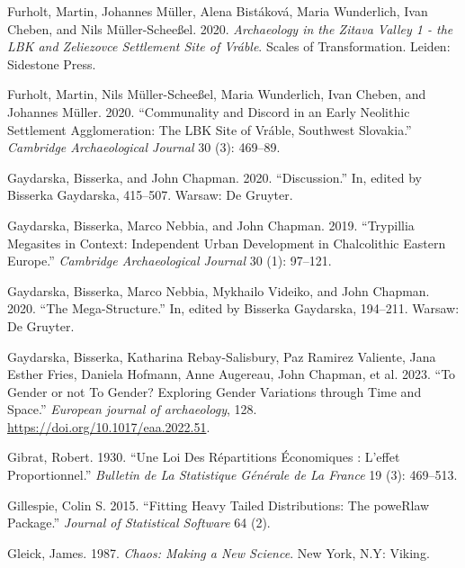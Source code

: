 \documentclass[
  12pt,
  a4paper, twoside]{book}
\newlength{\cslhangindent}
\newlength{\cslentryspacingunit} %
\newenvironment{CSLReferences}[2] %
 {%
  \setlength{\parindent}{0pt}
  \ifodd #1
  \let\oldpar\par
  \def\par{\hangindent=\cslhangindent\oldpar}
  \fi
  \setlength{\parskip}{#2\cslentryspacingunit}
 }%
 {}
\begin{document}
\begin{CSLReferences}{1}{0}
\leavevmode{}%
Furholt, Martin, Johannes Müller, Alena Bistáková, Maria Wunderlich, Ivan Cheben, and Nils Müller-Scheeßel. 2020. \emph{Archaeology in the Zitava Valley 1 - the LBK and Zeliezovce Settlement Site of Vráble}. Scales of Transformation. Leiden: Sidestone Press.

\leavevmode{}%
Furholt, Martin, Nils Müller-Scheeßel, Maria Wunderlich, Ivan Cheben, and Johannes Müller. 2020. {``Communality and Discord in an Early Neolithic Settlement Agglomeration: The LBK Site of Vráble, Southwest Slovakia.''} \emph{Cambridge Archaeological Journal} 30 (3): 469--89.

\leavevmode{}%
Gaydarska, Bisserka, and John Chapman. 2020. {``Discussion.''} In, edited by Bisserka Gaydarska, 415--507. Warsaw: De Gruyter.

\leavevmode{}%
Gaydarska, Bisserka, Marco Nebbia, and John Chapman. 2019. {``Trypillia Megasites in Context: Independent Urban Development in Chalcolithic Eastern Europe.''} \emph{Cambridge Archaeological Journal} 30 (1): 97--121.

\leavevmode{}%
Gaydarska, Bisserka, Marco Nebbia, Mykhailo Videiko, and John Chapman. 2020. {``The Mega-Structure.''} In, edited by Bisserka Gaydarska, 194--211. Warsaw: De Gruyter.

\leavevmode{}%
Gaydarska, Bisserka, Katharina Rebay-Salisbury, Paz Ramirez Valiente, Jana Esther Fries, Daniela Hofmann, Anne Augereau, John Chapman, et al. 2023. {``To Gender or not To Gender? Exploring Gender Variations through Time and Space.''} \emph{European journal of archaeology}, 128. \url{https://doi.org/10.1017/eaa.2022.51}.

\leavevmode{}%
Gibrat, Robert. 1930. {``Une Loi Des Répartitions Économiques : L'effet Proportionnel.''} \emph{Bulletin de La Statistique Générale de La France} 19 (3): 469--513.

\leavevmode{}%
Gillespie, Colin S. 2015. {``Fitting Heavy Tailed Distributions: The poweRlaw Package.''} \emph{Journal of Statistical Software} 64 (2).

\leavevmode{}%
Gleick, James. 1987. \emph{Chaos: Making a New Science}. {New York, N.Y}: {Viking}.


\end{CSLReferences}
\end{document}
